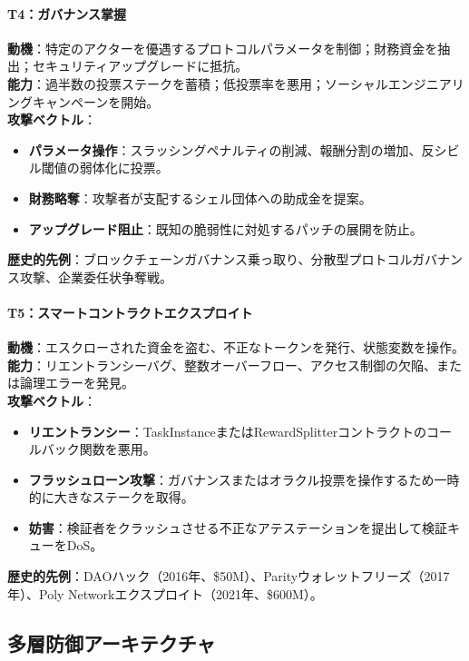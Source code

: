 \documentclass[11pt]{article}
\begin{document}
\paragraph{T4：ガバナンス掌握}
\textbf{動機}：特定のアクターを優遇するプロトコルパラメータを制御；財務資金を抽出；セキュリティアップグレードに抵抗。\\
\textbf{能力}：過半数の投票ステークを蓄積；低投票率を悪用；ソーシャルエンジニアリングキャンペーンを開始。\\
\textbf{攻撃ベクトル}：
\begin{itemize}[noitemsep]
  \item \textbf{パラメータ操作}：スラッシングペナルティの削減、報酬分割の増加、反シビル閾値の弱体化に投票。
  \item \textbf{財務略奪}：攻撃者が支配するシェル団体への助成金を提案。
  \item \textbf{アップグレード阻止}：既知の脆弱性に対処するパッチの展開を防止。
\end{itemize}
\textbf{歴史的先例}：ブロックチェーンガバナンス乗っ取り、分散型プロトコルガバナンス攻撃、企業委任状争奪戦。

\paragraph{T5：スマートコントラクトエクスプロイト}
\textbf{動機}：エスクローされた資金を盗む、不正なトークンを発行、状態変数を操作。\\
\textbf{能力}：リエントランシーバグ、整数オーバーフロー、アクセス制御の欠陥、または論理エラーを発見。\\
\textbf{攻撃ベクトル}：
\begin{itemize}[noitemsep]
  \item \textbf{リエントランシー}：TaskInstanceまたはRewardSplitterコントラクトのコールバック関数を悪用。
  \item \textbf{フラッシュローン攻撃}：ガバナンスまたはオラクル投票を操作するため一時的に大きなステークを取得。
  \item \textbf{妨害}：検証者をクラッシュさせる不正なアテステーションを提出して検証キューをDoS。
\end{itemize}
\textbf{歴史的先例}：DAOハック（2016年、\$50M）、Parityウォレットフリーズ（2017年）、Poly Networkエクスプロイト（2021年、\$600M）。

\subsection{多層防御アーキテクチャ}
\end{document}
